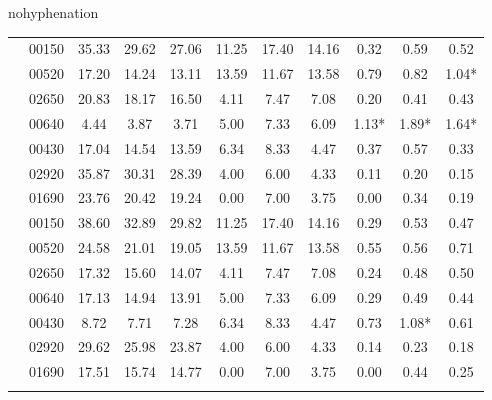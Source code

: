 \begin{hyphenrules}{nohyphenation}
\begin{table}[H]
{\begin{tabular}{>{\raggedleft\arraybackslash}p{4cm} lccCccCccc}
             & 00150 & 35.33 & 29.62 & 27.06 & 11.25 & 17.40 & 14.16 & 0.32 & 0.59 & 0.52 \\
            & 00520 &                       17.20 & 14.24 & 13.11 &     13.59 & 11.67 & 13.58 & 0.79 & 0.82 & 1.04* \\
            & 02650 &                       20.83 & 18.17 & 16.50 &     4.11 & 7.47 & 7.08 &    0.20 & 0.41 & 0.43 \\
            & 00640 &                       4.44 & 3.87 & 3.71 &        5.00 & 7.33 & 6.09 &    1.13* & 1.89* & 1.64* \\
            & 00430 &                       17.04 & 14.54 & 13.59 &     6.34 & 8.33 & 4.47 &    0.37 & 0.57 & 0.33 \\
            & 02920 &                       35.87 & 30.31 & 28.39 &     4.00 & 6.00 & 4.33 &    0.11 & 0.20 & 0.15 \\
            & 01690 &                       23.76 & 20.42 & 19.24 &     0.00 & 7.00 & 3.75 &    0.00 & 0.34 & 0.19 \\
            \midrule
            
             & 00150 & 38.60 & 32.89 & 29.82 & 11.25 & 17.40 & 14.16 & 0.29 & 0.53 & 0.47 \\
            & 00520 &                       24.58 & 21.01 & 19.05 &     13.59 & 11.67 & 13.58 & 0.55 & 0.56 & 0.71 \\
            & 02650 &                       17.32 & 15.60 & 14.07 &     4.11 & 7.47 & 7.08 &    0.24 & 0.48 & 0.50 \\
            & 00640 &                       17.13 & 14.94 & 13.91 &     5.00 & 7.33 & 6.09 &    0.29 & 0.49 & 0.44 \\
            & 00430 &                       8.72 & 7.71 & 7.28 &        6.34 & 8.33 & 4.47 &    0.73 & 1.08* & 0.61 \\
            & 02920 &                       29.62 & 25.98 & 23.87 &     4.00 & 6.00 & 4.33 &    0.14 & 0.23 & 0.18 \\
            & 01690 &                       17.51 & 15.74 & 14.77 &     0.00 & 7.00 & 3.75 &    0.00 & 0.44 & 0.25 \\
            \midrule
            

\end{tabular}}
\end{table}
\end{hyphenrules}
